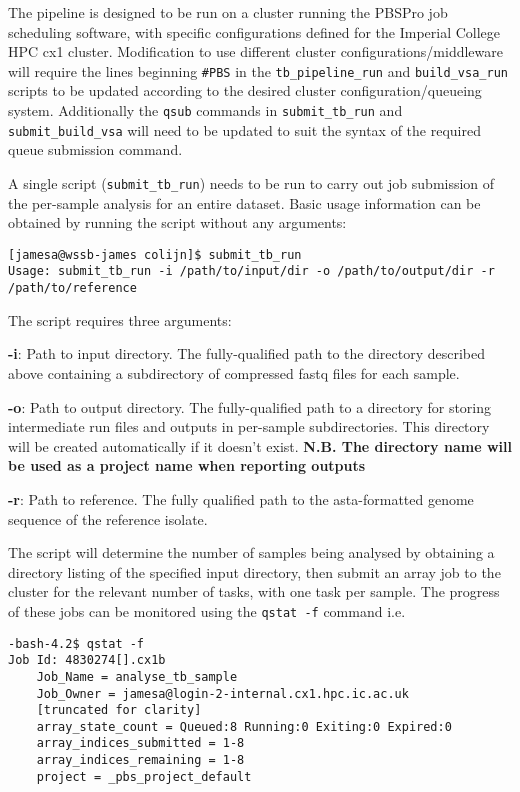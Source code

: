 \documentclass[a4paper,10pt,twoside]{article}
\newenvironment{tight_itemize}{
\begin{itemize}
  \setlength{\itemsep}{0pt}
  \setlength{\parskip}{0pt}
}{\end{itemize}}
\begin{document}
The pipeline is designed to be run on a cluster running the PBSPro job
scheduling software, with specific configurations defined for the Imperial
College HPC cx1 cluster. Modification to use different cluster
configurations/middleware will require the lines beginning {\tt \#PBS} in
the {\tt tb\_pipeline\_run} and {\tt build\_vsa\_run} scripts to be updated
according to the desired cluster configuration/queueing system. Additionally the
{\tt qsub} commands in {\tt submit\_tb\_run} and {\tt submit\_build\_vsa} will need
to be updated to suit the syntax of the required queue submission command. 

A single script ({\tt submit\_tb\_run}) needs to be run to carry out job
submission of the per-sample analysis for an entire dataset. Basic usage
information can be obtained by running the script without any arguments:

\begin{verbatim}
[jamesa@wssb-james colijn]$ submit_tb_run 
Usage: submit_tb_run -i /path/to/input/dir -o /path/to/output/dir -r /path/to/reference
\end{verbatim}

The script requires three arguments:

\begin{tight_itemize}
\item \textbf{-i}: Path to input directory. The fully-qualified path to
the directory described above containing a subdirectory of compressed fastq
files for each sample.
 \item \textbf{-o}: Path to output directory. The fully-qualified path to a
directory for storing intermediate run files and outputs in per-sample
subdirectories. This directory will be created automatically if it doesn't
exist. \textbf{N.B. The directory name will be used as a project name when reporting outputs}
\item \textbf{-r}: Path to reference. The fully qualified path to the
asta-formatted genome sequence of the reference isolate.
\end{tight_itemize}

The script will determine the number of samples being analysed by obtaining a
directory listing of the specified input directory, then submit an array job to
the cluster for the relevant number of tasks, with one task per sample. The
progress of these jobs can be monitored using the {\tt qstat -f} command i.e. 

\begin{verbatim}
-bash-4.2$ qstat -f
Job Id: 4830274[].cx1b
    Job_Name = analyse_tb_sample
    Job_Owner = jamesa@login-2-internal.cx1.hpc.ic.ac.uk
	[truncated for clarity]
    array_state_count = Queued:8 Running:0 Exiting:0 Expired:0 
    array_indices_submitted = 1-8
    array_indices_remaining = 1-8
    project = _pbs_project_default
\end{verbatim}
\end{document}
